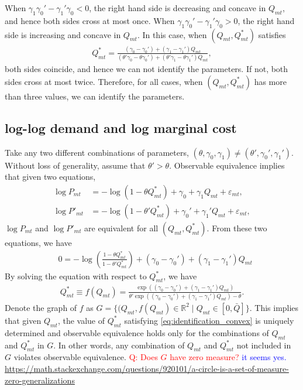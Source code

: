 \documentclass[11pt]{article}
\numberwithin{figure}{section}
\theoremstyle{definition}
\newcommand{\0}{\mathbf{0}}
\begin{document}
When $\gamma_1\gamma_0' - \gamma_1' \gamma_0 < 0$, the right hand side is decreasing and concave in $Q_{mt}$, and hence both sides cross at most once.
When $\gamma_1\gamma_0' - \gamma_1' \gamma_0 >0$, the right hand side is increasing and concave in $Q_{mt}$.
In this case, when $(Q_{mt}, Q^*_{mt})$ satisfies
\begin{align*}
    Q^*_{mt} = \frac{(\gamma_0 - \gamma_0') + (\gamma_1 - \gamma_1')Q_{mt}}{(\theta'\gamma_0 - \theta\gamma_0') + (\theta'\gamma_1 - \theta\gamma_1')Q_{mt}},
\end{align*}
both sides coincide, and hence we can not identify the parameters. If not, both sides cross at most twice.
Therefore, for all cases, when $(Q_{mt}, Q^*_{mt})$ has more than three values, we can identify the parameters.

\subsection{log-log demand and log marginal cost}
    Take any two different combinations of parameters, $(\theta, \gamma_0, \gamma_1) \ne (\theta', \gamma_0', \gamma_1')$. Without loss of generality, assume that $\theta' > \theta$. Observable equivalence implies that given two equations,
    \begin{align}
        \log P_{mt} &= -\log \left(  1 - \theta Q^*_{mt} \right) +\gamma_0 + \gamma_1 Q_{mt} + \varepsilon_{mt},\\
        \log P'_{mt} &= -\log \left(  1 - \theta' Q^*_{mt} \right) +\gamma_0' + \gamma_1' Q_{mt} + \varepsilon_{mt},
    \end{align}
    $\log P_{mt}$ and $\log P'_{mt}$ are equivalent for all $(Q_{mt}, Q^*_{mt})$.
    From these two equations, we have
    \begin{align}\label{eq:identification_convex}
        &0  = -\log \left( \frac{ 1 - \theta Q^*_{mt}}{ 1 - \theta' Q^*_{mt}} \right) +(\gamma_0 -\gamma_0') + (\gamma_1 - \gamma_1') Q_{mt}
    \end{align}
    By solving the equation with respect to $Q^*_{mt}$, we have
    \begin{align*}
        Q^*_{mt} \equiv f(Q_{mt}) = \frac{\exp((\gamma_0 -\gamma_0') + (\gamma_1 - \gamma_1') Q_{mt})}{\theta'\exp((\gamma_0 -\gamma_0') + (\gamma_1 - \gamma_1') Q_{mt}) - \theta }.
    \end{align*}
    Denote the graph of $f$ as $G = \{ (Q_{mt}, f(Q_{mt}) \in \mathbb{R}^2 \mid Q_{mt} \in [0,\bar{Q}] \}$.
    This implies that given $Q_{mt}$, the value of $ Q^*_{mt}$ satisfying \eqref{eq:identification_convex} is uniquely determined and observable equivalence holds only for the combinations of $Q_{mt}$ and $Q^*_{mt}$ in $G$. In other words, any combination of $Q_{mt}$ and $Q^*_{mt}$ not included in $G$ violates observable equivalence.
    \textcolor{red}{Q: Does $ G$ have zero measure?} \textcolor{blue}{it seems yes. \url{ https://math.stackexchange.com/questions/920101/a-circle-is-a-set-of-measure-zero-generalizations}}
    
\end{document}
